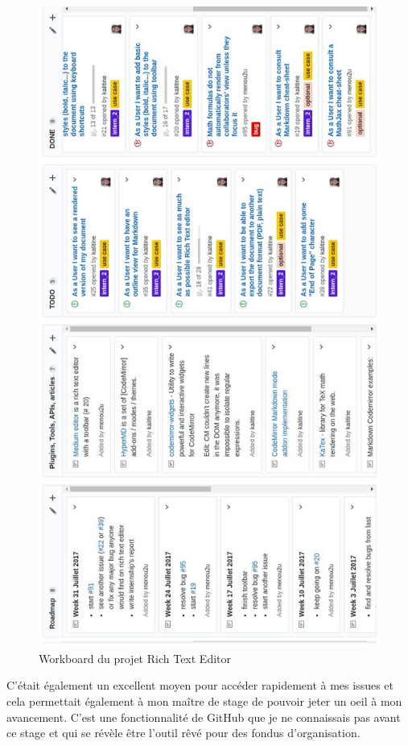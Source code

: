 \documentclass[12pt]{article}
\begin{document}
\newpage
\begin{figure}[H]
\centering
\includegraphics[scale=0.52]{gallery/workboard.jpg}
\caption[nom dans le sommaire]{Workboard du projet Rich Text Editor}
\label{fig:gallery1}
\end{figure}

\newpage
C'était également un excellent moyen pour accéder rapidement à mes issues et cela permettait également à mon maître de stage de pouvoir jeter un oeil à mon avancement. C'est une fonctionnalité de GitHub que je ne connaissais pas avant ce stage et qui se révèle être l'outil rêvé pour des fondus d'organisation.\\
\end{document}

